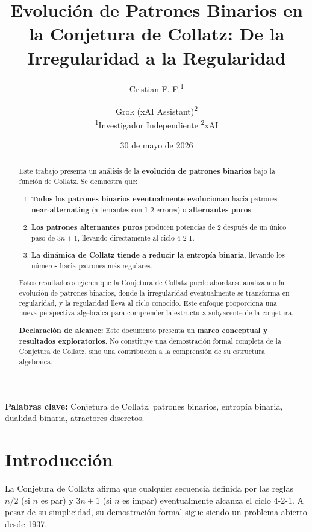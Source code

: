 \documentclass[11pt,a4paper]{article}
\title{\textbf{Evolución de Patrones Binarios en la Conjetura de Collatz: De la Irregularidad a la Regularidad}}
\author{
Cristian F. F.\textsuperscript{1} \and
Grok (xAI Assistant)\textsuperscript{2} \\
\smallskip
\textsuperscript{1}Investigador Independiente \quad
\textsuperscript{2}xAI
}
\date{30 de mayo de 2026}
\begin{document}
\maketitle

\begin{abstract}
Este trabajo presenta un análisis de la \textbf{evolución de patrones binarios} bajo la función de Collatz. Se demuestra que:

\begin{enumerate}
    \item \textbf{Todos los patrones binarios eventualmente evolucionan} hacia patrones \textbf{near-alternating} (alternantes con 1-2 errores) o \textbf{alternantes puros}.
    
    \item \textbf{Los patrones alternantes puros} producen potencias de 2 después de un único paso de \( 3n + 1 \), llevando directamente al ciclo 4-2-1.
    
    \item \textbf{La dinámica de Collatz tiende a reducir la entropía binaria}, llevando los números hacia patrones más regulares.
\end{enumerate}

Estos resultados sugieren que la Conjetura de Collatz puede abordarse analizando la evolución de patrones binarios, donde la irregularidad eventualmente se transforma en regularidad, y la regularidad lleva al ciclo conocido. Este enfoque proporciona una nueva perspectiva algebraica para comprender la estructura subyacente de la conjetura.

\textbf{Declaración de alcance:} Este documento presenta un \textbf{marco conceptual y resultados exploratorios}. No constituye una demostración formal completa de la Conjetura de Collatz, sino una contribución a la comprensión de su estructura algebraica.
\end{abstract}

\textbf{Palabras clave:} Conjetura de Collatz, patrones binarios, entropía binaria, dualidad binaria, atractores discretos.

\section{Introducción}

La Conjetura de Collatz afirma que cualquier secuencia definida por las reglas \( n/2 \) (si \( n \) es par) y \( 3n + 1 \) (si \( n \) es impar) eventualmente alcanza el ciclo 4-2-1. A pesar de su simplicidad, su demostración formal sigue siendo un problema abierto desde 1937.
\end{document}
